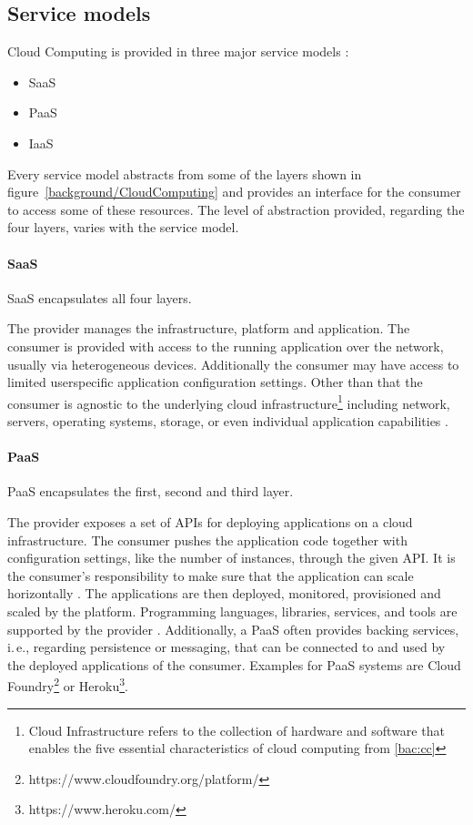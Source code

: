 
\subsection{Service models}
\label{bac:ccServiceModels}
Cloud Computing is provided in three major service models \citep[p. 1]{DefCC2011}:
\begin{itemize}
\item \acf{SaaS}
\item \acf{PaaS}
\item \acf{IaaS}
\end{itemize}

Every service model abstracts from some of the layers shown in figure~\ref{background/CloudComputing} and provides an interface for the consumer to access some of these resources. 
The level of abstraction provided, regarding the four layers, varies with the service model.

\paragraph{\acl{SaaS}}
\ac{SaaS} encapsulates all four layers. 

The provider manages the infrastructure, platform and application.
The consumer is provided with access to the running application over the network, usually via heterogeneous devices.
Additionally the consumer may have access to limited userspecific application configuration settings.
Other than that the consumer is agnostic to the underlying cloud infrastructure\footnote{Cloud Infrastructure refers to the collection of hardware and software that enables the five essential characteristics of cloud computing from \ref{bac:cc}} including network, servers, operating systems, storage, or even individual application capabilities  \citep[p. 2]{DefCC2011}.

\paragraph{\acl{PaaS}}
\ac{PaaS} encapsulates the first, second and third layer.

The provider exposes a set of \acs{API}s for deploying applications on a cloud infrastructure.
The consumer pushes the application code together with configuration settings, like the number of instances, through the given \acs{API}.
It is the consumer's responsibility to make sure that the application can scale horizontally \citep[p. 79]{Teixeira2014}.
The applications are then deployed, monitored, provisioned and scaled by the platform.
Programming languages, libraries, services, and tools are supported by the provider \citep[p. 3]{DefCC2011}.
Additionally, a \ac{PaaS} often provides backing services, i.\,e., regarding persistence or messaging, that can be connected to and used by the deployed applications of the consumer.
Examples for \ac{PaaS} systems are Cloud Foundry\footnote{https://www.cloudfoundry.org/platform/} or Heroku\footnote{https://www.heroku.com/}.

